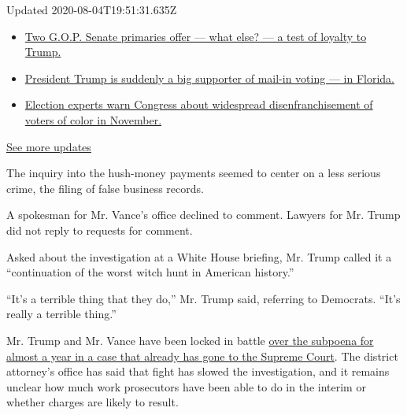 Updated 2020-08-04T19:51:31.635Z

\begin{itemize}
\tightlist
\item
  \href{https://www.nytimes3xbfgragh.onion/2020/08/04/us/elections/primary-election-michigan-arizona-kansas.html?action=click\&pgtype=Article\&state=default\&region=MAIN_CONTENT_1\&context=storylines_live_updates\#link-3924dd44}{Two
  G.O.P. Senate primaries offer --- what else? --- a test of loyalty to
  Trump.}
\item
  \href{https://www.nytimes3xbfgragh.onion/2020/08/04/us/elections/primary-election-michigan-arizona-kansas.html?action=click\&pgtype=Article\&state=default\&region=MAIN_CONTENT_1\&context=storylines_live_updates\#link-32b39e33}{President
  Trump is suddenly a big supporter of mail-in voting --- in Florida.}
\item
  \href{https://www.nytimes3xbfgragh.onion/2020/08/04/us/elections/primary-election-michigan-arizona-kansas.html?action=click\&pgtype=Article\&state=default\&region=MAIN_CONTENT_1\&context=storylines_live_updates\#link-6d019753}{Election
  experts warn Congress about widespread disenfranchisement of voters of
  color in November.}
\end{itemize}

\href{https://www.nytimes3xbfgragh.onion/2020/08/04/us/elections/primary-election-michigan-arizona-kansas.html?action=click\&pgtype=Article\&state=default\&region=MAIN_CONTENT_1\&context=storylines_live_updates}{See
more updates}

The inquiry into the hush-money payments seemed to center on a less
serious crime, the filing of false business records.

A spokesman for Mr. Vance's office declined to comment. Lawyers for Mr.
Trump did not reply to requests for comment.

Asked about the investigation at a White House briefing, Mr. Trump
called it a ``continuation of the worst witch hunt in American
history.''

``It's a terrible thing that they do,'' Mr. Trump said, referring to
Democrats. ``It's really a terrible thing.''

Mr. Trump and Mr. Vance have been locked in battle
\href{https://www.nytimes3xbfgragh.onion/interactive/2018/10/02/us/politics/donald-trump-tax-schemes-fred-trump.html}{over
the subpoena for almost a year in a case that already has gone to the
Supreme Court}. The district attorney's office has said that fight has
slowed the investigation, and it remains unclear how much work
prosecutors have been able to do in the interim or whether charges are
likely to result.

